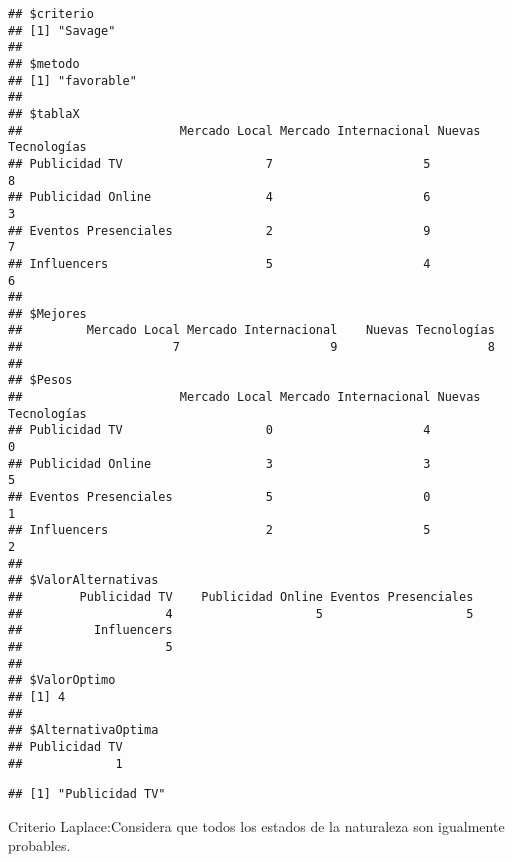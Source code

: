 \documentclass[
]{article}
\newenvironment{Shaded}{\begin{snugshade}}{\end{snugshade}}
\newcommand{\FunctionTok}[1]{\textcolor[rgb]{0.13,0.29,0.53}{\textbf{#1}}}
\newcommand{\NormalTok}[1]{#1}
\newcommand{\OtherTok}[1]{\textcolor[rgb]{0.56,0.35,0.01}{#1}}
\newcommand{\SpecialCharTok}[1]{\textcolor[rgb]{0.81,0.36,0.00}{\textbf{#1}}}
\begin{document}
\begin{verbatim}
## $criterio
## [1] "Savage"
## 
## $metodo
## [1] "favorable"
## 
## $tablaX
##                      Mercado Local Mercado Internacional Nuevas Tecnologías
## Publicidad TV                    7                     5                  8
## Publicidad Online                4                     6                  3
## Eventos Presenciales             2                     9                  7
## Influencers                      5                     4                  6
## 
## $Mejores
##         Mercado Local Mercado Internacional    Nuevas Tecnologías 
##                     7                     9                     8 
## 
## $Pesos
##                      Mercado Local Mercado Internacional Nuevas Tecnologías
## Publicidad TV                    0                     4                  0
## Publicidad Online                3                     3                  5
## Eventos Presenciales             5                     0                  1
## Influencers                      2                     5                  2
## 
## $ValorAlternativas
##        Publicidad TV    Publicidad Online Eventos Presenciales 
##                    4                    5                    5 
##          Influencers 
##                    5 
## 
## $ValorOptimo
## [1] 4
## 
## $AlternativaOptima
## Publicidad TV 
##             1
\end{verbatim}

\begin{Shaded}
\end{Shaded}

\begin{verbatim}
## [1] "Publicidad TV"
\end{verbatim}

Criterio Laplace:Considera que todos los estados de la naturaleza son
igualmente probables.

\begin{Shaded}
\end{Shaded}
\end{document}
